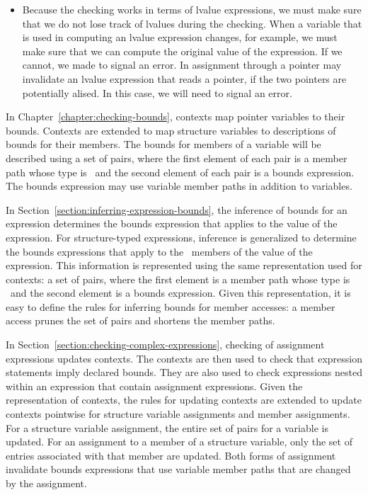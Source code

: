 \begin{itemize}
\item Because the checking works in terms of lvalue expressions, we must make sure that we 
do not lose track of lvalues during the checking.  When a variable that is used in computing an
lvalue expression changes, for example, we must make sure that we can compute the original
value of the expression.  If we cannot, we made to signal an error.  In assignment through a pointer
may invalidate an lvalue expression that reads a pointer, if the two pointers are potentially alised.
In this case, we will need to signal an error.
\end{itemize}

In Chapter~\ref{chapter:checking-bounds}, contexts map pointer variables to their bounds.
Contexts are extended to map structure variables to descriptions of bounds for their
members.  The bounds for members of a variable will be described using a set of pairs,
where the first element of each pair is a member path whose type is \arrayptr\
and the second element of each pair is a bounds expression.  The bounds expression may use 
variable member paths in addition to variables.

In Section~\ref{section:inferring-expression-bounds}, the inference of bounds for an
expression determines the bounds expression that applies to the value of the
expression.  For structure-typed expressions, inference is generalized to determine
the bounds expressions that apply to the \arrayptr\ members of the value 
of the expression.  This information is represented using the same
representation used for contexts: a set of pairs, where the first element 
is a member path whose type is \arrayptr\ and the second element is a 
bounds expression.  Given this representation, it is easy to define
the rules for inferring bounds for member accesses: a member access prunes the
set of pairs and shortens the member paths.

In Section~\ref{section:checking-complex-expressions}, checking of assignment
expressions updates contexts.  The contexts are then used to check that expression
statements imply declared bounds.  They are also used to check expressions nested
within an expression that contain assignment expressions. 
Given the representation of contexts, the rules for updating contexts
are extended to update contexts pointwise for structure variable assignments and member 
assignments.  For a structure variable assignment, the entire set of pairs for a
variable is updated.  For an assignment to a member of a  structure variable,
only the set of entries  associated with that member are updated.  Both forms of assignment
invalidate bounds expressions that use variable member paths that are changed by the
assignment.

